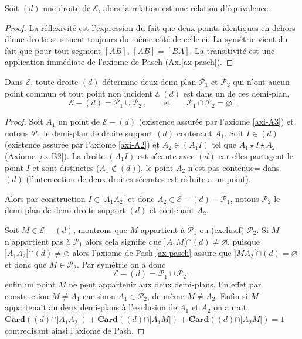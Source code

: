 \begin{prop}\label{prop-memecoterelequi}
Soit $(d)$ une droite de $\mathcal{E}$, alors la relation  est une relation d'équivalence.
\end{prop}

\begin{proof}
La réflexivité est l'expression du fait que deux points identiques en dehors d'une droite se situent toujours du même côté de celle-ci. La symétrie vient du fait que pour tout segment $[AB]$, $[AB]=[BA]$. La transitivité est une application immédiate de l'axiome de Pasch (Ax.\ref{ax-pasch}). 
\end{proof}

\begin{thm}\label{thm-partitiondemiplan}
Dans $\mathcal{E}$, toute droite $(d)$ détermine deux demi-plan $\mathcal{P}_1$ et $\mathcal{P}_2$ qui n'ont aucun point commun et tout point non incident à $(d)$ est dans un de ces demi-plan,
\begin{equation*}
    \mathcal{E} - (d) = \mathcal{P}_1 \cup \mathcal{P}_2\,, \qquad \text{et} \qquad \mathcal{P}_1 \cap \mathcal{P}_2 = \varnothing\,.
\end{equation*}
\begin{proof}
Soit $A_1$ un point de $\mathcal{E} - (d)$ (existence assurée par l'axiome \ref{axi-A3}) et notons $\mathcal{P}_1$ le demi-plan de droite support $(d)$ contenant $A_1$. Soit $I\in (d)$ (existence assurée par l'axiome \ref{axi-A2}) et $A_2\in(A_1 I)$ tel que $A_1 \star I \star A_2$ (Axiome \ref{ax-B2}). La droite $(A_1 I)$ est sécante avec $(d)$ car elles partagent le point $I$ et sont distinctes ($A_1\notin (d)$), le point $A_2$ n'est pas contenue= dans $(d)$ (l'intersection de deux droites sécantes est réduite a un point).

Alors par construction $I\in ]A_1 A_2[$ et donc $A_2 \in \mathcal{E}-(d)-\mathcal{P}_1$, notons $\mathcal{P}_2$ le demi-plan de demi-droite support $(d)$ et contenant $A_2$. 

Soit $M\in\mathcal{E}-(d)$, montrons que $M$ appartient à $\mathcal{P}_1$ ou (exclusif) $\mathcal{P}_2$. Si $M$ n'appartient pas à $\mathcal{P}_1$ alors cela signifie que $]A_1 M[\cap (d) \neq \varnothing$, puisque $]A_1 A_2[\cap (d) \neq \varnothing$ alors l'axiome de Pash \ref{ax-pasch} assure que $]M A_2[\cap (d) = \varnothing$ et donc que $M \in \mathcal{P}_2$. Par symétrie on a donc $$\mathcal{E} - (d) = \mathcal{P}_1 \cup \mathcal{P}_2\,,$$ enfin un point $M$ ne peut appartenir aux deux demi-plans. En effet par construction $M\neq A_1$ car sinon $A_1 \in \mathcal{P}_2$, de même $M\neq A_2$. Enfin si $M$ appartenait au deux demi-plans à l'exclusion de $A_1$ et $A_2$ on aurait $\mathbf{Card}\left((d)\cap]A_1 A_2[\right)+\mathbf{Card}\left((d)\cap]A_1 M[\right)+\mathbf{Card}\left((d)\cap]A_2 M[\right)=1$ contredisant ainsi l'axiome de Pash. 
\end{proof}
\end{thm}


